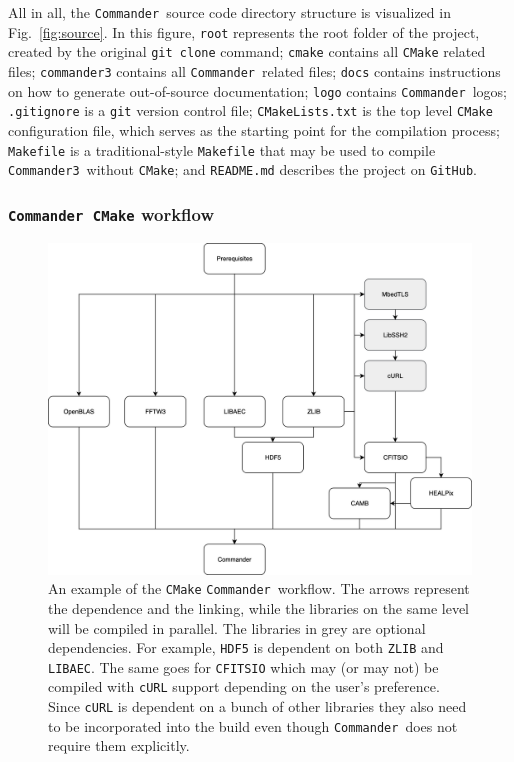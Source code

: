 \documentclass[twocolumn]{openjournal}
\def\commander{\texttt{Commander}}
\def\commanderthree{\texttt{Commander3}}
\begin{document}
All in all, the \commander\ source code directory structure is visualized in
Fig.~\ref{fig:source}. In this figure, \texttt{root} represents the root folder
of the project, created by the original \texttt{git clone} command;
\texttt{cmake} contains all \texttt{CMake} related files; \texttt{commander3}
contains all \commander\ related files; \texttt{docs} contains instructions on
how to generate out-of-source documentation; \texttt{logo} contains \commander\
logos; \texttt{.gitignore} is a \texttt{git} version control file;
\texttt{CMakeLists.txt} is the top level \texttt{CMake} configuration file,
which serves as the starting point for the compilation process;
\texttt{Makefile} is a traditional-style \texttt{Makefile} that may be used to
compile \commanderthree\ without \texttt{CMake}; and \texttt{README.md}
describes the project on \texttt{GitHub}.


\subsubsection{\commander\ \texttt{CMake} workflow}
\label{sec:cmake-code-organization}

\begin{figure}[t]
      \center
      \includegraphics[scale=0.75]{figures/Commander_CMake_workflow.png}
      \caption{An example of the \texttt{CMake} \commander\ workflow. 
      The arrows represent the dependence and the linking, while the libraries 
      on the same level will be compiled in parallel. The libraries in grey are 
      optional dependencies. For example, \texttt{HDF5} is dependent on both \texttt{ZLIB} and \texttt{LIBAEC}. 
      The same goes for \texttt{CFITSIO} which may (or may not) be compiled with \texttt{cURL} 
      support depending on the user's preference. Since \texttt{cURL} is dependent on 
      a bunch of other libraries they also need to be incorporated into the build 
      even though \commander\ does not require them explicitly. 
      }
      \label{fig:cmake-workflow}
\end{figure}
\end{document}

